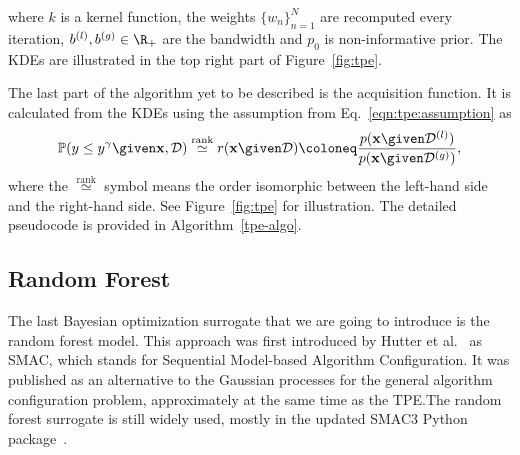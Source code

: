 \noindent
where $k$ is a kernel function, the weights $\{ w_n \}_{n=1}^N$ are recomputed every iteration, $b^{(l)},b^{(g)} \in \R_+$ are the bandwidth and $p_0$ is non-informative prior. The KDEs are illustrated in the top right part of Figure~\ref{fig:tpe}.

The last part of the algorithm yet to be described is the acquisition function. It is calculated from the KDEs using the assumption from Eq.~\ref{eqn:tpe:assumption} as
\[
\mathbb{P}(y \leq y^\gamma \given \mathbf{x},\mathcal{D}) \overset{\text{rank}}{\simeq} r(\mathbf{x} \given \mathcal{D}) \coloneq  \frac{p(\mathbf{x} \given \mathcal{D}^{(l)})}{p(\mathbf{x} \given \mathcal{D}^{(g)})} ,
\]
where the $\overset{\text{rank}}{\simeq}$ symbol means the order isomorphic between the left-hand side and the right-hand side. See Figure~\ref{fig:tpe} for illustration. The detailed pseudocode is provided in Algorithm~\ref{tpe-algo}.




\subsection{Random Forest}
The last Bayesian optimization surrogate that we are going to introduce is the random forest model. This approach was first introduced by Hutter et al.~\cite{hutter2010sequential} as SMAC, which stands for Sequential Model-based Algorithm Configuration. It was published as an alternative to the Gaussian processes for the general algorithm configuration problem, approximately at the same time as the TPE.\@ The random forest surrogate is still widely used, mostly in the updated SMAC3 Python package~\cite{smac3}.

